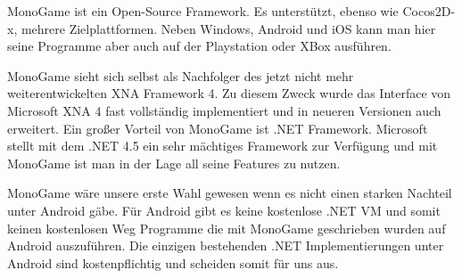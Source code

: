 MonoGame ist ein Open-Source \CS Framework. Es unterstützt, ebenso wie Cocos2D-x, mehrere Zielplattformen. Neben Windows, Android und iOS kann man hier seine Programme aber auch auf der Playstation oder XBox ausführen.

MonoGame sieht sich selbst als Nachfolger des jetzt nicht mehr weiterentwickelten \cite{XNAEND} XNA Framework 4. Zu diesem Zweck wurde das Interface von Microsoft XNA 4 fast vollständig implementiert und in neueren Versionen auch erweitert.
Ein großer Vorteil von MonoGame ist .NET Framework. Microsoft stellt mit dem .NET 4.5 ein sehr mächtiges Framework zur Verfügung und mit MonoGame ist man in der Lage all seine Features zu nutzen.

MonoGame wäre unsere erste Wahl gewesen wenn es nicht einen starken Nachteil unter Android gäbe. Für Android gibt es keine kostenlose .NET VM und somit keinen kostenlosen Weg Programme die mit MonoGame geschrieben wurden auf Android auszuführen. Die einzigen bestehenden .NET Implementierungen unter Android sind kostenpflichtig und scheiden somit für uns aus.